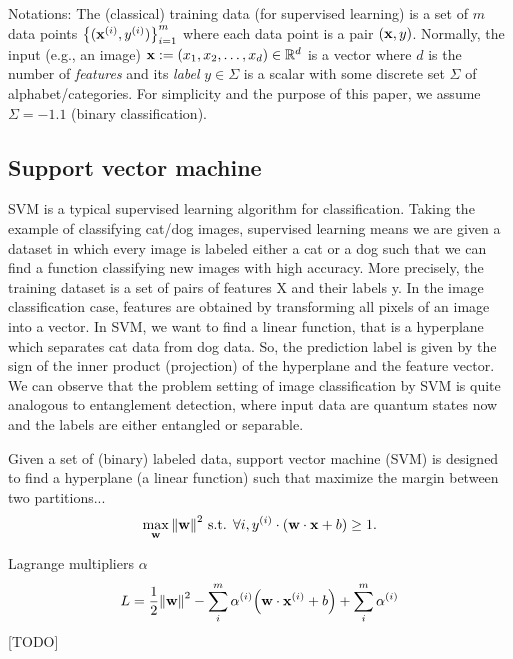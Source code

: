Notations:
The (classical) training data (for supervised learning) is a set of $m$ data points $\qty{(\vb{x}^{(i)}, y^{(i)})}^{m}_{i=1}$ 
where each data point is a pair $(\vb{x},y)$.
Normally, the input (e.g., an image) $\vb{x}:= (x_1,x_2,\dots,x_d) \in \mathbb{R}^d$  is a vector where $d$ is the number of \emph{features}
and its \emph{label} $y\in\Sigma$ is a scalar with some discrete set $\Sigma$ of alphabet/categories. 
For simplicity and the purpose of this paper, we assume $\Sigma=\qty{-1,1}$ (binary classification).


\subsection{Support vector machine}\label{sec:svm}
SVM is a typical supervised learning algorithm for classification. Taking the example of classifying cat/dog images, supervised learning means we are given a dataset in which every image is labeled either a cat or a dog such that we can find a function classifying new images with high accuracy. More precisely,  the training dataset is a set of pairs of features X and their labels y. In the image classification case, features are obtained by transforming all pixels of an image into a vector. In SVM, we want to find a linear function, that is a hyperplane which separates cat data from dog data. So, the prediction label is given by the sign of the inner product (projection) of the hyperplane and the feature vector. We can observe that the problem setting of image classification by SVM is quite analogous to entanglement detection, where input data are quantum states now and the labels are either entangled or separable.


\begin{definition}[SVM]\label{def:svm}
	Given a set of (binary) labeled data,
	support vector machine (SVM) is designed to
	find a hyperplane (a linear function) such that maximize the margin between two partitions...
	\begin{equation}
		\max_{\vb{w}}
		\norm{\vb{w}}^2
		\text{ s.t. }
		\forall i , y^{(i)}\cdot (\vb{w}\cdot\vb{x}+b)\ge 1.
		\label{eq:svm_opt}
	\end{equation}
\end{definition}
Lagrange multipliers $\alpha$
\begin{equation}
	L = \frac{1}{2}\norm{\vb{w}}^2 - \sum_i^m \alpha^{(i)} \qty(\vb{w}\cdot \vb{x}^{(i)} + b) + \sum_i^m \alpha^{(i)}
\end{equation}
[TODO]

